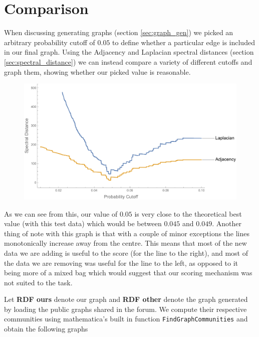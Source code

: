 \documentclass[english, 12pt]{article}
\begin{document}
\section{Comparison}
When discussing generating graphs (section \ref{sec:graph_gen}) we picked an arbitrary probability cutoff of $0.05$ to define whether a particular edge is included in our final graph. Using the Adjacency and Laplacian spectral distances (section \ref{sec:spectral_distance}) we can instead compare a variety of different cutoffs and graph them, showing whether our picked value is reasonable.
\begin{figure}[H]
\centering
\includegraphics[scale=0.6]{CutoffComparison.pdf}
\end{figure}
As we can see from this, our value of $0.05$ is very close to the theoretical best value (with this test data) which would be between $0.045$ and $0.049$. Another thing of note with this graph is that with a couple of minor exceptions the lines monotonically increase away from the centre. This means that most of the new data we are adding is useful to the score (for the line to the right), and most of the data we are removing was useful for the line to the left, as opposed to it being more of a mixed bag which would suggest that our scoring mechanism was not suited to the task.

Let {\bf RDF ours} denote our graph and {\bf RDF other} denote the graph generated by loading the public graphs shared in the forum. We compute their respective communities using mathematica's built in function \texttt{FindGraphCommunities} and obtain the following graphs
\end{document}
